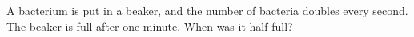 A bacterium is put in a beaker, and the number of bacteria doubles every second. The beaker is full after one minute. When was it half full?
